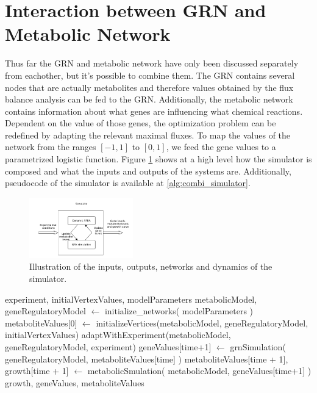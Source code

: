 \section{Interaction between GRN and Metabolic Network}\label{sec:fba}
Thus far the GRN and metabolic network have only been discussed separately from eachother, but it's possible to combine
them. The GRN contains several nodes that are actually metabolites and therefore values obtained by the flux balance analysis
can be fed to the GRN. Additionally, the metabolic network contains information about what genes are influencing what
chemical reactions. Dependent on the value of those genes, the optimization problem can be redefined by adapting the 
relevant maximal fluxes. 
To map the values of the network from the ranges $[-1,1]$ to $[0,1]$, we feed the gene values to a parametrized logistic function.
Figure \ref{fig:simulator} shows at a high level how the simulator is composed and what the inputs
and outputs of the systems are. Additionally, pseudocode of the simulator is available at \ref{alg:combi_simulator}.
\begin{figure}	
    \centering
    \includegraphics[width=0.4\textwidth]{images/simulator.png}
    \caption{ Illustration of the inputs, outputs, networks and dynamics of the simulator. }
    \label{fig:simulator}
\end{figure}
\begin{algorithmic}\label{alg:combi_simulator}
  \Require experiment, initialVertexValues, modelParameters
  \State metabolicModel, geneRegulatoryModel $\leftarrow$ initialize\_networks( modelParameters )
  \State metaboliteValues[0] $\leftarrow$ initializeVertices(metabolicModel, geneRegulatoryModel, initialVertexValues)
  \State adaptWithExperiment(metabolicModel, geneRegulatoryModel, experiment)
  \State geneValues[time+1] $\leftarrow$ grnSimulation( geneRegulatoryModel, metaboliteValues[time] )
  \State metaboliteValues[time + 1], growth[time + 1] $\leftarrow$ metabolicSmulation( metabolicModel, geneValues[time+1] )
  \EndFor \\
  \Return growth, geneValues, metaboliteValues
  
  \EndFunction 
\end{algorithmic} 


